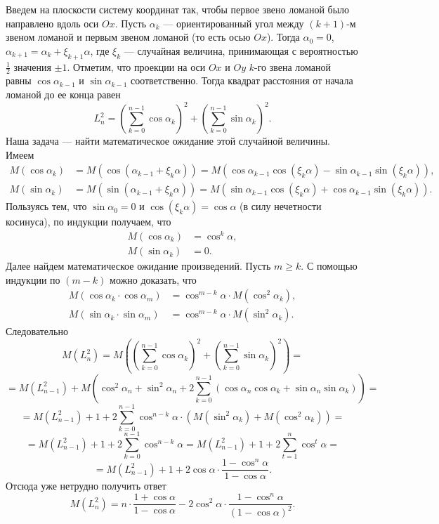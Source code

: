 \documentclass{article}
\begin{document}
Введем на плоскости систему координат так, чтобы первое звено ломаной было направлено вдоль оси $Ox$. Пусть $\alpha_k$ --- ориентированный угол между $(k+1)$-м звеном ломаной и первым звеном ломаной (то есть осью $Ox$). Тогда $\alpha_0=0$, $\alpha_{k+1} = \alpha_k + \xi_{k+1} \alpha$, где $\xi_k$ --- случайная величина, принимающая с вероятностью $\frac12$ значения $\pm 1$. Отметим, что проекции на оси $Ox$ и $Oy$ $k$-го звена ломаной равны $\cos \alpha_{k-1}$ и $\sin \alpha_{k-1}$ соответственно. Тогда квадрат расстояния от начала ломаной до ее конца равен
$$L_n^2 = \left( \sum\limits_{k=0}^{n-1} \cos \alpha_k \right)^2 + \left( \sum\limits_{k=0}^{n-1} \sin \alpha_k \right)^2.$$
Наша задача --- найти математическое ожидание этой случайной величины.\\
Имеем
\begin{align*}
M(\cos \alpha_k) &= M(\cos(\alpha_{k-1} + \xi_k \alpha)) = M(\cos \alpha_{k-1} \cos (\xi_k \alpha) - \sin \alpha_{k-1} \sin (\xi_k \alpha)),\\
M(\sin \alpha_k) &= M(\sin(\alpha_{k-1} + \xi_k \alpha)) = M(\sin \alpha_{k-1} \cos (\xi_k \alpha) + \cos \alpha_{k-1} \sin (\xi_k \alpha)).
\end{align*}
Пользуясь тем, что $\sin \alpha_0 = 0$ и $\cos (\xi_k \alpha) = \cos \alpha$ (в силу нечетности косинуса), по индукции получаем, что
\begin{align*}
M(\cos \alpha_k) &= \cos^k \alpha,\\
M(\sin \alpha_k) &= 0.
\end{align*}
Далее найдем математическое ожидание произведений. Пусть $m \geqslant k$. С помощью индукции по $(m-k)$ можно доказать, что
\begin{align*}
M(\cos \alpha_k \cdot \cos \alpha_m) &= \cos^{m-k} \alpha \cdot M(\cos^2 \alpha_k),\\
M(\sin \alpha_k \cdot \sin \alpha_m) &= \cos^{m-k} \alpha \cdot M(\sin^2 \alpha_k).
\end{align*}
Следовательно
$$M(L_n^2) = M \left( \left( \sum\limits_{k=0}^{n-1} \cos \alpha_k \right)^2 + \left( \sum\limits_{k=0}^{n-1} \sin \alpha_k \right)^2 \right) = $$
$$= M(L_{n-1}^2) + M \left( \cos^2 \alpha_n + \sin^2 \alpha_n + 2 \sum\limits_{k=0}^{n-1} (\cos \alpha_n \cos \alpha_k + \sin \alpha_n \sin \alpha_k) \right) = $$
$$= M(L_{n-1}^2) + 1 + 2 \sum\limits_{k=0}^{n-1} \cos^{n-k} \alpha \cdot (M(\sin^2 \alpha_k) + M(\cos^2 \alpha_k)) = $$
$$= M(L_{n-1}^2) + 1 + 2 \sum\limits_{k=0}^{n-1} \cos^{n-k} \alpha = M(L_{n-1}^2) + 1 + 2 \sum\limits_{t=1}^n \cos^t \alpha = $$
$$= M(L_{n-1}^2) + 1 + 2\cos \alpha \cdot \frac{1 - \cos^n \alpha}{1 - \cos \alpha}.$$
Отсюда уже нетрудно получить ответ
$$M(L_n^2) = n \cdot \frac{1+\cos \alpha}{1 - \cos \alpha} - 2 \cos^2 \alpha \cdot \frac{1 - \cos^n \alpha}{(1 - \cos \alpha)^2}.$$
\end{document}
